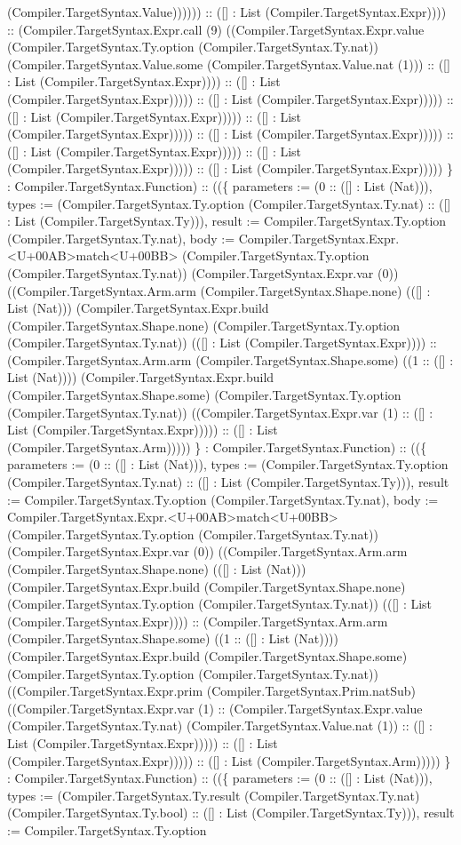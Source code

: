 \documentclass[11pt]{article}
\begin{document}
(Compiler.TargetSyntax.Value)))))) :: ([] : List (Compiler.TargetSyntax.Expr)))) :: (Compiler.TargetSyntax.Expr.call (9) ((Compiler.TargetSyntax.Expr.value (Compiler.TargetSyntax.Ty.option (Compiler.TargetSyntax.Ty.nat)) (Compiler.TargetSyntax.Value.some (Compiler.TargetSyntax.Value.nat (1))) :: ([] : List (Compiler.TargetSyntax.Expr)))) :: ([] : List (Compiler.TargetSyntax.Expr))))) :: ([] : List (Compiler.TargetSyntax.Expr))))) :: ([] : List (Compiler.TargetSyntax.Expr))))) :: ([] : List (Compiler.TargetSyntax.Expr))))) :: ([] : List (Compiler.TargetSyntax.Expr))))) :: ([] : List (Compiler.TargetSyntax.Expr))))) :: ([] : List (Compiler.TargetSyntax.Expr))))) :: ([] : List (Compiler.TargetSyntax.Expr))))) \} : Compiler.TargetSyntax.Function) :: ((\{ parameters := (0 :: ([] : List (Nat))), types := (Compiler.TargetSyntax.Ty.option (Compiler.TargetSyntax.Ty.nat) :: ([] : List (Compiler.TargetSyntax.Ty))), result := Compiler.TargetSyntax.Ty.option (Compiler.TargetSyntax.Ty.nat), body := Compiler.TargetSyntax.Expr.<U+00AB>match<U+00BB> (Compiler.TargetSyntax.Ty.option (Compiler.TargetSyntax.Ty.nat)) (Compiler.TargetSyntax.Expr.var (0)) ((Compiler.TargetSyntax.Arm.arm (Compiler.TargetSyntax.Shape.none) (([] : List (Nat))) (Compiler.TargetSyntax.Expr.build (Compiler.TargetSyntax.Shape.none) (Compiler.TargetSyntax.Ty.option (Compiler.TargetSyntax.Ty.nat)) (([] : List (Compiler.TargetSyntax.Expr)))) :: (Compiler.TargetSyntax.Arm.arm (Compiler.TargetSyntax.Shape.some) ((1 :: ([] : List (Nat)))) (Compiler.TargetSyntax.Expr.build (Compiler.TargetSyntax.Shape.some) (Compiler.TargetSyntax.Ty.option (Compiler.TargetSyntax.Ty.nat)) ((Compiler.TargetSyntax.Expr.var (1) :: ([] : List (Compiler.TargetSyntax.Expr))))) :: ([] : List (Compiler.TargetSyntax.Arm))))) \} : Compiler.TargetSyntax.Function) :: ((\{ parameters := (0 :: ([] : List (Nat))), types := (Compiler.TargetSyntax.Ty.option (Compiler.TargetSyntax.Ty.nat) :: ([] : List (Compiler.TargetSyntax.Ty))), result := Compiler.TargetSyntax.Ty.option (Compiler.TargetSyntax.Ty.nat), body := Compiler.TargetSyntax.Expr.<U+00AB>match<U+00BB> (Compiler.TargetSyntax.Ty.option (Compiler.TargetSyntax.Ty.nat)) (Compiler.TargetSyntax.Expr.var (0)) ((Compiler.TargetSyntax.Arm.arm (Compiler.TargetSyntax.Shape.none) (([] : List (Nat))) (Compiler.TargetSyntax.Expr.build (Compiler.TargetSyntax.Shape.none) (Compiler.TargetSyntax.Ty.option (Compiler.TargetSyntax.Ty.nat)) (([] : List (Compiler.TargetSyntax.Expr)))) :: (Compiler.TargetSyntax.Arm.arm (Compiler.TargetSyntax.Shape.some) ((1 :: ([] : List (Nat)))) (Compiler.TargetSyntax.Expr.build (Compiler.TargetSyntax.Shape.some) (Compiler.TargetSyntax.Ty.option (Compiler.TargetSyntax.Ty.nat)) ((Compiler.TargetSyntax.Expr.prim (Compiler.TargetSyntax.Prim.natSub) ((Compiler.TargetSyntax.Expr.var (1) :: (Compiler.TargetSyntax.Expr.value (Compiler.TargetSyntax.Ty.nat) (Compiler.TargetSyntax.Value.nat (1)) :: ([] : List (Compiler.TargetSyntax.Expr))))) :: ([] : List (Compiler.TargetSyntax.Expr))))) :: ([] : List (Compiler.TargetSyntax.Arm))))) \} : Compiler.TargetSyntax.Function) :: ((\{ parameters := (0 :: ([] : List (Nat))), types := (Compiler.TargetSyntax.Ty.result (Compiler.TargetSyntax.Ty.nat) (Compiler.TargetSyntax.Ty.bool) :: ([] : List (Compiler.TargetSyntax.Ty))), result := Compiler.TargetSyntax.Ty.option 
\end{document}
